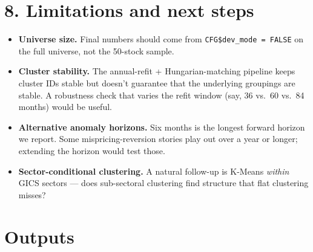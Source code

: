 \documentclass[
  letterpaper,
  DIV=11,
  numbers=noendperiod]{scrartcl}
\newenvironment{Shaded}{\begin{snugshade}}{\end{snugshade}}
\newcommand{\AttributeTok}[1]{\textcolor[rgb]{0.40,0.45,0.13}{#1}}
\newcommand{\ConstantTok}[1]{\textcolor[rgb]{0.56,0.35,0.01}{#1}}
\newcommand{\DecValTok}[1]{\textcolor[rgb]{0.68,0.00,0.00}{#1}}
\newcommand{\FunctionTok}[1]{\textcolor[rgb]{0.28,0.35,0.67}{#1}}
\newcommand{\NormalTok}[1]{\textcolor[rgb]{0.00,0.23,0.31}{#1}}
\newcommand{\SpecialCharTok}[1]{\textcolor[rgb]{0.37,0.37,0.37}{#1}}
\newcommand{\StringTok}[1]{\textcolor[rgb]{0.13,0.47,0.30}{#1}}
\providecommand{\tightlist}{%
  \setlength{\itemsep}{0pt}\setlength{\parskip}{0pt}}
\begin{document}
\section{8. Limitations and next
steps}\label{limitations-and-next-steps}

\begin{itemize}
\tightlist
\item
  \textbf{Universe size.} Final numbers should come from
  \texttt{CFG\$dev\_mode\ =\ FALSE} on the full universe, not the
  50-stock sample.
\item
  \textbf{Cluster stability.} The annual-refit + Hungarian-matching
  pipeline keeps cluster IDs stable but doesn't guarantee that the
  underlying groupings are stable. A robustness check that varies the
  refit window (say, 36 vs.~60 vs.~84 months) would be useful.
\item
  \textbf{Alternative anomaly horizons.} Six months is the longest
  forward horizon we report. Some mispricing-reversion stories play out
  over a year or longer; extending the horizon would test those.
\item
  \textbf{Sector-conditional clustering.} A natural follow-up is K-Means
  \emph{within} GICS sectors --- does sub-sectoral clustering find
  structure that flat clustering misses?
\end{itemize}

\section{Outputs}\label{outputs}

\begin{Shaded}
\end{Shaded}
\end{document}
